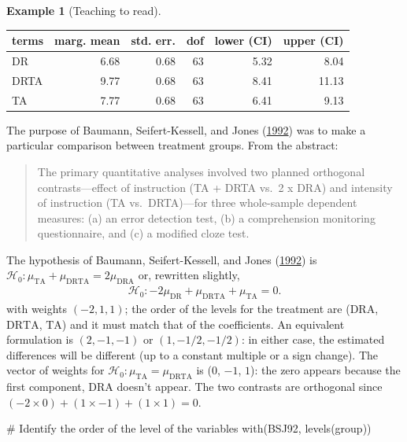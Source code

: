 \documentclass[
  11pt,
  letterpaper,
]{scrbook}
\newenvironment{Shaded}{\begin{snugshade}}{\end{snugshade}}
\newcommand{\CommentTok}[1]{\textcolor[rgb]{0.37,0.37,0.37}{#1}}
\newcommand{\FunctionTok}[1]{\textcolor[rgb]{0.28,0.35,0.67}{#1}}
\newcommand{\NormalTok}[1]{\textcolor[rgb]{0.00,0.23,0.31}{#1}}
\theoremstyle{definition}
\newtheorem{example}{Example}[chapter]
\theoremstyle{remark}
\begin{document}
\begin{example}[Teaching to
read]
\begin{table}
\centering
\begin{tabular}{lrrrrr}
\toprule
terms & marg. mean & std. err. & dof & lower (CI) & upper (CI)\\
\midrule
DR & 6.68 & 0.68 & 63 & 5.32 & 8.04\\
DRTA & 9.77 & 0.68 & 63 & 8.41 & 11.13\\
TA & 7.77 & 0.68 & 63 & 6.41 & 9.13\\
\bottomrule
\end{tabular}
\end{table}

The purpose of Baumann, Seifert-Kessell, and Jones
(\protect\hyperlink{ref-Baumann:1992}{1992}) was to make a particular
comparison between treatment groups. From the abstract:

\begin{quote}
The primary quantitative analyses involved two planned orthogonal
contrasts---effect of instruction (TA + DRTA vs.~2 x DRA) and intensity
of instruction (TA vs.~DRTA)---for three whole-sample dependent
measures: (a) an error detection test, (b) a comprehension monitoring
questionnaire, and (c) a modified cloze test.
\end{quote}

The hypothesis of Baumann, Seifert-Kessell, and Jones
(\protect\hyperlink{ref-Baumann:1992}{1992}) is
\(\mathscr{H}_0: \mu_{\mathrm{TA}} + \mu_{\mathrm{DRTA}} = 2 \mu_{\mathrm{DRA}}\)
or, rewritten slightly, \begin{align*}
\mathscr{H}_0: - 2 \mu_{\mathrm{DR}} + \mu_{\mathrm{DRTA}} + \mu_{\mathrm{TA}} = 0.
\end{align*} with weights \((-2, 1, 1)\); the order of the levels for
the treatment are (\(\mathrm{DRA}\), \(\mathrm{DRTA}\), \(\mathrm{TA}\))
and it must match that of the coefficients. An equivalent formulation is
\((2, -1, -1)\) or \((1, -1/2, -1/2)\): in either case, the estimated
differences will be different (up to a constant multiple or a sign
change). The vector of weights for
\(\mathscr{H}_0: \mu_{\mathrm{TA}} = \mu_{\mathrm{DRTA}}\) is (\(0\),
\(-1\), \(1\)): the zero appears because the first component,
\(\mathrm{DRA}\) doesn't appear. The two contrasts are orthogonal since
\((-2 \times 0) + (1 \times -1) + (1 \times 1) = 0\).

\begin{Shaded}
\begin{Highlighting}[]
\CommentTok{\# Identify the order of the level of the variables}
\FunctionTok{with}\NormalTok{(BSJ92, }\FunctionTok{levels}\NormalTok{(group))}
\end{Highlighting}
\end{Shaded}


\end{example}
\end{document}
